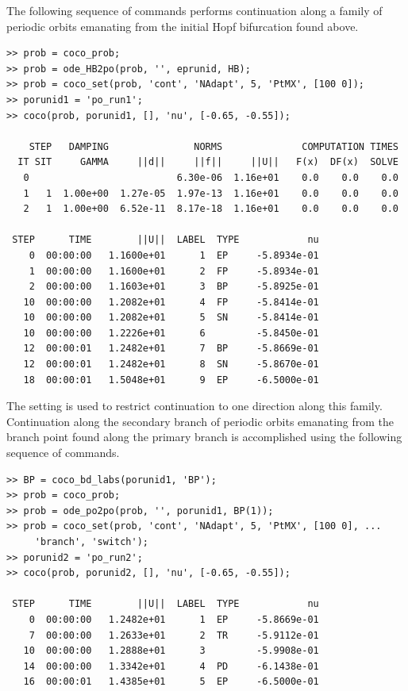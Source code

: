 The following sequence of commands performs continuation along a family of periodic orbits emanating from the initial Hopf bifurcation found above.
\begin{lstlisting}[language=coco-highlight,frame=lines]
>> prob = coco_prob;
>> prob = ode_HB2po(prob, '', eprunid, HB);
>> prob = coco_set(prob, 'cont', 'NAdapt', 5, 'PtMX', [100 0]);
>> porunid1 = 'po_run1';
>> coco(prob, porunid1, [], 'nu', [-0.65, -0.55]);

    STEP   DAMPING               NORMS              COMPUTATION TIMES
  IT SIT     GAMMA     ||d||     ||f||     ||U||   F(x)  DF(x)  SOLVE
   0                          6.30e-06  1.16e+01    0.0    0.0    0.0
   1   1  1.00e+00  1.27e-05  1.97e-13  1.16e+01    0.0    0.0    0.0
   2   1  1.00e+00  6.52e-11  8.17e-18  1.16e+01    0.0    0.0    0.0

 STEP      TIME        ||U||  LABEL  TYPE            nu
    0  00:00:00   1.1600e+01      1  EP     -5.8934e-01
    1  00:00:00   1.1600e+01      2  FP     -5.8934e-01
    2  00:00:00   1.1603e+01      3  BP     -5.8925e-01
   10  00:00:00   1.2082e+01      4  FP     -5.8414e-01
   10  00:00:00   1.2082e+01      5  SN     -5.8414e-01
   10  00:00:00   1.2226e+01      6         -5.8450e-01
   12  00:00:01   1.2482e+01      7  BP     -5.8669e-01
   12  00:00:01   1.2482e+01      8  SN     -5.8670e-01
   18  00:00:01   1.5048e+01      9  EP     -6.5000e-01
\end{lstlisting}
The  setting is used to restrict continuation to one direction along this family. Continuation along the secondary branch of periodic orbits emanating from the branch point found along the primary branch is accomplished using the following sequence of commands.
\begin{lstlisting}[language=coco-highlight,frame=lines]
>> BP = coco_bd_labs(porunid1, 'BP');
>> prob = coco_prob;
>> prob = ode_po2po(prob, '', porunid1, BP(1));
>> prob = coco_set(prob, 'cont', 'NAdapt', 5, 'PtMX', [100 0], ...
     'branch', 'switch');
>> porunid2 = 'po_run2';
>> coco(prob, porunid2, [], 'nu', [-0.65, -0.55]);

 STEP      TIME        ||U||  LABEL  TYPE            nu
    0  00:00:00   1.2482e+01      1  EP     -5.8669e-01
    7  00:00:00   1.2633e+01      2  TR     -5.9112e-01
   10  00:00:00   1.2888e+01      3         -5.9908e-01
   14  00:00:00   1.3342e+01      4  PD     -6.1438e-01
   16  00:00:01   1.4385e+01      5  EP     -6.5000e-01
\end{lstlisting}

